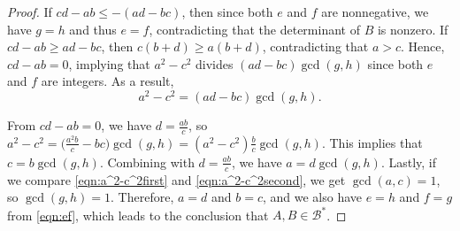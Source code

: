 \documentclass[10pt,a4paper]{amsart}
\newcommand{\Bstar}{\mathcal{B}^*}
\begin{document}
\begin{proof}
If $cd-ab\leq-(ad-bc)$, then since both $e$ and $f$ are nonnegative, we have $g=h$ and thus $e=f$, contradicting that the determinant of $B$ is nonzero. If $cd-ab\geq ad-bc$, then $c(b+d)\geq a(b+d)$, contradicting that $a>c$. Hence, $cd-ab=0$, implying that $a^2-c^2$ divides $(ad-bc)\gcd(g,h)$ since both $e$ and $f$ are integers. As a result,
\begin{equation}\label{eqn:a^2-c^2second}
a^2-c^2=(ad-bc)\gcd(g,h).
\end{equation}

From $cd-ab=0$, we have $d=\frac{ab}{c}$, so $a^2-c^2=\big(\frac{a^2b}{c}-bc\big)\gcd(g,h)=(a^2-c^2)\frac{b}{c}\gcd(g,h)$. This implies that $c=b\gcd(g,h)$. Combining with $d=\frac{ab}{c}$, we have $a=d\gcd(g,h)$. Lastly, if we compare \eqref{eqn:a^2-c^2first} and \eqref{eqn:a^2-c^2second}, we get $\gcd(a,c)=1$, so $\gcd(g,h)=1$. Therefore, $a=d$ and $b=c$, and we also have $e=h$ and $f=g$ from \eqref{eqn:ef}, which leads to the conclusion that $A,B\in\Bstar$.
\end{proof}
\end{document}
